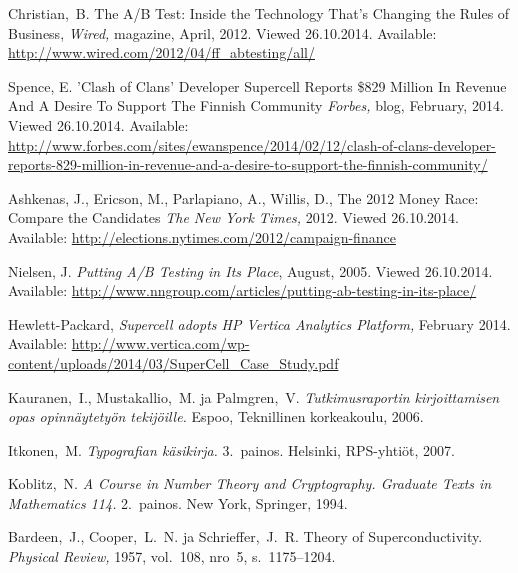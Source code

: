 \documentclass[english,12pt,a4paper,pdftex,elec,utf8]{aaltothesis}
\begin{document}
\begin{thebibliography}{99}

 Christian,\ B. The A/B Test: Inside the Technology That’s Changing the Rules of Business,
  \textit{Wired,} magazine, April, 2012.
  Viewed 26.10.2014.  Available:
  \url{http://www.wired.com/2012/04/ff_abtesting/all/}

 Spence, E. 'Clash of Clans' Developer Supercell Reports \$829 Million In Revenue And A Desire To Support The Finnish Community
\textit{Forbes,} blog, February, 2014.
Viewed 26.10.2014. Available:
\url{http://www.forbes.com/sites/ewanspence/2014/02/12/clash-of-clans-developer-reports-829-million-in-revenue-and-a-desire-to-support-the-finnish-community/}

 Ashkenas, J., Ericson, M., Parlapiano, A., Willis, D., The 2012 Money Race: Compare the Candidates
\textit{The New York Times,} 2012.
Viewed 26.10.2014. Available:
\url{http://elections.nytimes.com/2012/campaign-finance}

 Nielsen, J. \textit{Putting A/B Testing in Its Place}, August, 2005.
Viewed 26.10.2014. Available:
\url{http://www.nngroup.com/articles/putting-ab-testing-in-its-place/}

 Hewlett-Packard, \textit{Supercell adopts HP Vertica Analytics Platform,}
February 2014. Available:
\url{http://www.vertica.com/wp-content/uploads/2014/03/SuperCell_Case_Study.pdf}

 Kauranen,\ I., Mustakallio,\ M. ja Palmgren,\ V.
  \textit{Tutkimusraportin kirjoittamisen opas opinn\"aytety\"on
    tekij\"oille.}  Espoo, Teknillinen korkeakoulu, 2006.

 Itkonen,\ M. \textit{Typografian k\"asikirja.} 3.\
  painos.  Helsinki, RPS-yhti\"ot, 2007.

 Koblitz,\ N. \textit{A Course in Number Theory and
    Cryptography. Graduate Texts in Mathematics 114.}  2.\ painos. New
  York, Springer, 1994.

\bibitem{bcs} Bardeen,\ J., Cooper,\ L.\ N. ja Schrieffer,\ J.\ R.
  Theory of Superconductivity. \textit{Physical Review,} 1957, vol.\
  108, nro~5, s.\ 1175--1204.


\end{thebibliography}
\end{document}

